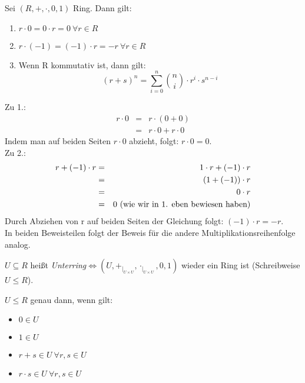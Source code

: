 \documentclass[10pt]{scrbook}
\begin{document}
\begin{Le}
Sei $(R, +, \cdot, 0, 1)$ Ring. Dann gilt:
\begin{enumerate}
	\item $r\cdot 0=0\cdot r=0\ \forall r\in R$
	\item $r\cdot (-1)=(-1)\cdot r=-r\ \forall r\in R$
	\item Wenn R kommutativ ist, dann gilt: \begin{displaymath}\left(r+s\right)^n=\sum\limits_{i=0}^n{\binom {n} {i}}\cdot r^i\cdot s^{n-i}\end{displaymath}
\end{enumerate}
\end{Le}
\begin{bew}
Zu 1.:
\begin{eqnarray*}
	r\cdot 0 & = & r\cdot (0+0) \\
	& = & r\cdot 0 + r\cdot 0
\end{eqnarray*}
Indem man auf beiden Seiten $r\cdot 0$ abzieht, folgt: $r\cdot 0=0$.\\

Zu 2.:
\begin{eqnarray*}
	r+(-1)\cdot r & = & 1\cdot r+(-1)\cdot r \\
	& = & (1+(-1))\cdot r \\
	& = & 0\cdot r \\
	& = & 0\textnormal{ (wie wir in 1. eben bewiesen haben)}
\end{eqnarray*}
Durch Abziehen von r auf beiden Seiten der Gleichung folgt: $(-1)\cdot r=-r$.\\

In beiden Beweisteilen folgt der Beweis für die andere Multiplikationsreihenfolge analog.
\end{bew}

\begin{Def}
$U\subseteq R$ heißt \emph{Unterring}$\Leftrightarrow (U, +_{|_{U\times U}}, \cdot_{|_{U\times U}}, 0, 1)$ wieder ein Ring ist (Schreibweise $U\leq R$).
\end{Def}

\begin{Le}
$U\leq R$ genau dann, wenn gilt:
\begin{itemize}
  \item $0\in U$
  \item $1\in U$
	\item $r+s\in U\ \forall r,s\in U$
	\item $r\cdot s\in U\ \forall r,s\in U$
\end{itemize}
\end{Le}
\end{document}
